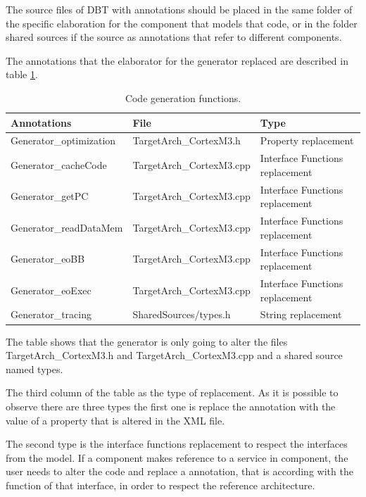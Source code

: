 \documentclass[11pt]{report}
\begin{document}
	The source files of DBT with annotations should be placed in the same folder of the specific elaboration for the component that models that code, or in the folder shared sources if the source as annotations that refer to different components. 
	
	The annotations that the elaborator for the generator replaced are described in table \ref{annotationTable}.
	\begin{table}[h]
		\caption{Code generation functions.}
		\label{annotationTable}
		\centering
		\begin{tabular}{|l||l||l|}
			\hline
			\textbf{Annotations} 	& \textbf{File} 			& \textbf{Type}\\ \hline
			Generator\_optimization & TargetArch\_CortexM3.h 	& Property replacement \\ \hline
			Generator\_cacheCode	& TargetArch\_CortexM3.cpp	& Interface Functions replacement \\ \hline
			Generator\_getPC		& TargetArch\_CortexM3.cpp	& Interface Functions replacement \\ \hline
			Generator\_readDataMem	& TargetArch\_CortexM3.cpp	& Interface Functions replacement \\ \hline
			Generator\_eoBB			& TargetArch\_CortexM3.cpp	& Interface Functions replacement \\ \hline
			Generator\_eoExec		& TargetArch\_CortexM3.cpp	& Interface Functions replacement \\ \hline
			Generator\_tracing		& SharedSources/types.h		& String replacement \\ \hline
			
		\end{tabular}
	\end{table}	
	
	The table shows that the generator is only going to alter the files TargetArch\_CortexM3.h and TargetArch\_CortexM3.cpp and a shared source named types.
	
	The third column of the table as the type of replacement. As it is possible to observe there are three types the first one is replace the annotation with the value of a property that is altered in the XML file. 
	
	The second type is the interface functions replacement to respect the interfaces from the model. If a component makes reference to a service in component, the user needs to alter the code and replace a annotation, that is according with the function of that interface, in order to respect the reference architecture. 
	
\end{document}

